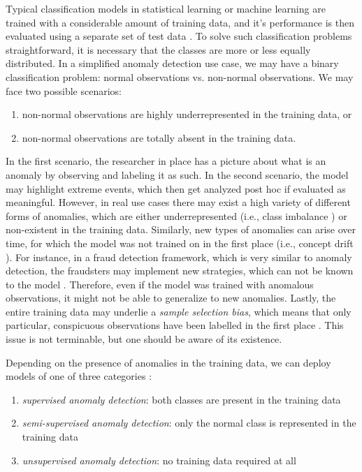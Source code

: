 \documentclass[conference]{IEEEtran}
\begin{document}
Typical classification models in statistical learning or machine learning are trained with a considerable amount of training data, and it's performance is then evaluated using a separate set of test data \cite{larose2014discovering}. To solve such classification problems straightforward, it is necessary that the classes are more or less equally distributed. In a simplified anomaly detection use case, we may have a binary classification problem: normal observations vs. non-normal observations. We may face two possible scenarios:
\begin{enumerate}
    \item non-normal observations are highly underrepresented in the training data, or
    \item non-normal observations are totally absent in the training data.
\end{enumerate}

In the first scenario, the researcher in place has a picture about what is an anomaly by observing and labeling it as such. In the second scenario, the model may highlight extreme events, which then get analyzed post hoc if evaluated as meaningful. However, in real use cases there may exist a high variety of different forms of anomalies, which are either underrepresented (i.e., class imbalance \cite{dal2017credit}) or non-existent in the training data. Similarly, new types of anomalies can arise over time, for which the model was not trained on in the first place (i.e., concept drift \cite{chandola2009anomaly}). For instance, in a fraud detection framework, which is very similar to anomaly detection, the fraudsters may implement new strategies, which can not be known to the model \cite{dal2017credit}. Therefore, even if the model was trained with anomalous observations, it might not be able to generalize to new anomalies. Lastly, the entire training data may underlie a \emph{sample selection bias}, which means that only particular, conspicuous observations have been labelled in the first place \cite{dal2017credit}. This issue is not terminable, but one should be aware of its existence.

Depending on the presence of anomalies in the training data, we can deploy models of one of three categories \cite{chandola2009anomaly}:
\begin{enumerate}
    \item \emph{supervised anomaly detection}: both classes are present in the training data 
    \item \emph{semi-supervised anomaly detection}: only the normal class is represented in the training data
    \item \emph{unsupervised anomaly detection}: no training data required at all
\end{enumerate}
\end{document}
